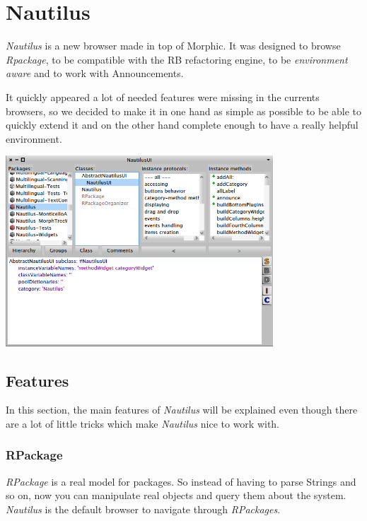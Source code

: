 \documentclass[a4paper,10pt,twoside]{book}
\newcommand\nautilus{\emph{Nautilus}\xspace}
\begin{document}
	
\fi
\sloppy


\chapter{Nautilus}


\nautilus is a new browser made in top of Morphic. It was designed to browse \emph{Rpackage}, to be compatible with the RB refactoring engine, to be \emph{environment aware} and to work with Announcements.

It quickly appeared a lot of needed features were missing in the currents browsers, so we decided to make it in one hand as simple as possible to be able to quickly extend it and on the other hand complete enough to have a really helpful environment.

\begin{center}
	\includegraphics[width=10cm]{figures/nautilus1}
	\label{fig:nautilus1}
\end{center}


\section{Features}

In this section, the main features of \nautilus will be explained even though there are a lot of little tricks which make \nautilus nice to work with.

\subsection*{RPackage}

\emph{RPackage} is a real model for packages. So instead of having to parse Strings and so on, now you can manipulate real objects and query them about the system. \nautilus is the default browser to navigate through \emph{RPackages}.
\end{document}
